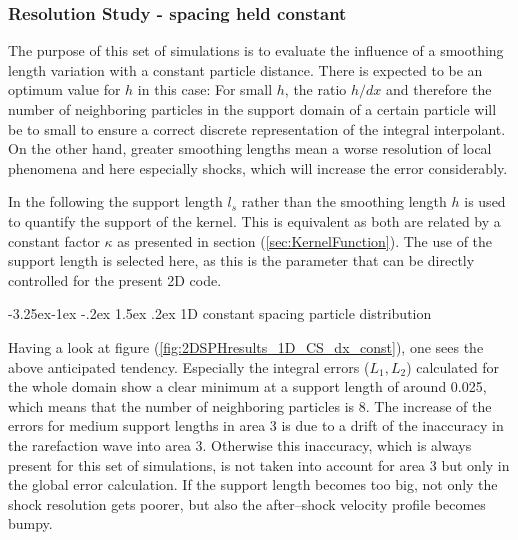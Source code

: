 \documentclass[11pt,a4paper,twoside]{report}
\makeatletter
\renewcommand\paragraph{\@startsection{paragraph}{4}{\z@}%
  {-3.25ex\@plus -1ex \@minus -.2ex}%
  {1.5ex \@plus .2ex}%
  {\normalfont\normalsize\bfseries}}
\makeatother
\begin{document}
\subsubsection{Resolution Study - spacing held constant}
\label{sec:2DSPH_results_shock_resSTudy_dx=const}
The purpose of this set of simulations is to evaluate the influence of a smoothing length variation with a constant particle distance. There is expected to be an optimum value for $h$ in this case: For small $h$, the ratio $h/dx$ and therefore the number of neighboring particles in the support domain of a certain particle will be to small to ensure a correct discrete representation of the integral interpolant. On the other hand, greater smoothing lengths mean a worse resolution of local phenomena and here especially shocks, which will increase the error considerably. 

In the following the support length $l_s$ rather than the smoothing length $h$ is used to quantify the support of the kernel. This is equivalent as both are related by a constant factor $\kappa$ as presented in section (\ref{sec:KernelFunction}). The use of the support length is selected here, as this is the parameter that can be directly controlled for the present 2D code. 


\paragraph{1D constant spacing particle distribution}

Having a look at figure (\ref{fig:2DSPHresults_1D_CS_dx_const}), one sees the above anticipated tendency. Especially the integral errors ($L_1,L_2$) calculated for the whole domain show a clear minimum at a support length of around 0.025, which means that the number of neighboring particles is 8. 
The increase of the errors for medium support lengths in area 3 is due to a drift of the inaccuracy in the rarefaction wave into area 3. Otherwise this inaccuracy, which is always present for this set of simulations, is not taken into account for area 3 but only in the global error calculation. 
If the support length becomes too big, not only the shock resolution gets poorer, but also the after--shock velocity profile becomes bumpy.
\end{document}
